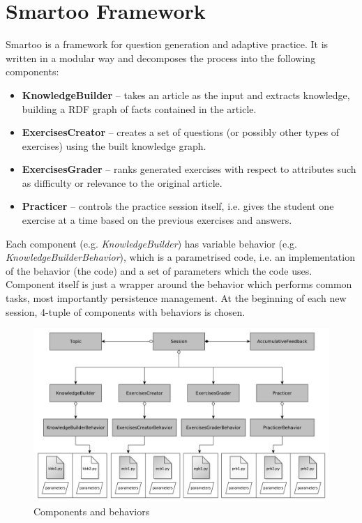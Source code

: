 \documentclass[12pt, twoside]{fithesis2}		%
\renewcommand{\_}{\leavevmode \kern0.07em\vbox{\hrule width0.4em}}
\newcommand{\squarebullet}{\textcolor{black}{\raisebox{0.15em}{\rule{4pt}{4pt}}}}
\newcommand{\emptysquarebullet}{\textcolor{black}{\raisebox{0.10em}{\tiny$\square$}}}
\newenvironment{myItemize}{
  \begin{itemize}[leftmargin=2em,rightmargin=1em,itemsep=\parskip ,parsep=0em,topsep=0em,partopsep=0em]
  \renewcommand{\labelitemi}{\squarebullet}
  \renewcommand{\labelitemii}{\textbullet}
}{
  \end{itemize}
}
\begin{document}
\chapter{Smartoo Framework}
\label{chap:smartoo}

Smartoo is a framework for question generation and adaptive practice.
It is written in a modular way and decomposes the process into the following components:
\begin{myItemize}
\item \textbf{KnowledgeBuilder} -- takes an article as the input and extracts knowledge, building a RDF graph of facts contained in the article.
\item \textbf{ExercisesCreator} -- creates a set of questions (or possibly other types of exercises) using the built knowledge graph.
\item \textbf{ExercisesGrader} -- ranks generated exercises with respect to attributes such as difficulty or relevance to the original article.
\item \textbf{Practicer} -- controls the practice session itself, i.e. gives the student one exercise at a time based on the previous exercises and answers.
\end{myItemize}
Each component (e.g. \textit{KnowledgeBuilder}) has variable behavior (e.g. \textit{KnowledgeBuilderBehavior}), which is a parametrised code, i.e. an implementation of the behavior (the code) and a set of parameters which the code uses.
Component itself is just a wrapper around the behavior which performs common tasks, most importantly persistence management.
At the beginning of each new session, 4-tuple of components with behaviors is chosen.%

\begin{figure}[h]
  \centering
  \includegraphics[width=\textwidth]{images/architecture.pdf}
  \caption{Components and behaviors}
  \label{fig:smartoo-architecture}
\end{figure}
\end{document}
